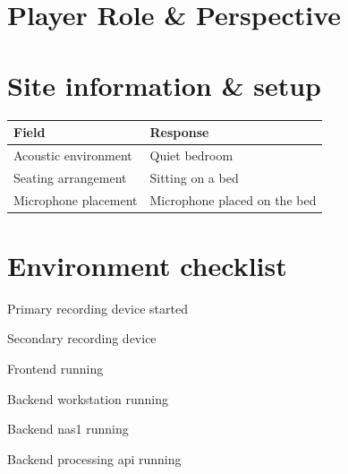 
\section{Player Role \& Perspective}

\section{Site information \& setup}
\begin{table}[h]
\centering
\begin{tabular}{|p{5cm}|p{10cm}|}
\hline
\textbf{Field} & \textbf{Response} \\ \hline
Acoustic environment & Quiet bedroom \\[1.5cm] \hline
Seating arrangement & Sitting on a bed \\[1.5cm] \hline
Microphone placement & Microphone placed on the bed\\[1.5cm] \hline
\end{tabular}
\end{table}

\section{Environment checklist}
    \begin{todolist}
    \item[\done] Primary recording device started
    \item[\done] Secondary recording device
    \item[\done] Frontend running
    \item[\done] Backend workstation running
    \item[\done] Backend nas1 running
    \item[\done] Backend processing api running
    \end{todolist}

